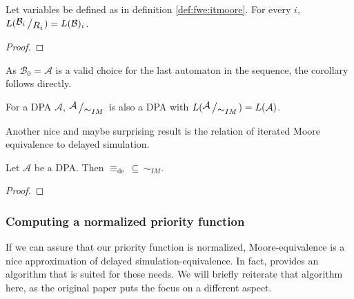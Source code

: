 \begin{lem}
	Let variables be defined as in definition \ref{def:fwe:itmoore}. For every $i$, $L(\bigslant{\mathcal{B}_i}{R_i}) = L(\mathcal{B})_i$.
\end{lem}

\begin{proof}
\end{proof}

As $\mathcal{B}_0 = \mathcal{A}$ is a valid choice for the last automaton in the sequence, the corollary follows directly.

\begin{cor}
	For a DPA $\mathcal{A}$, $\bigslant{\mathcal{A}}{\sim_{IM}}$ is also a DPA with $L(\bigslant{\mathcal{A}}{\sim_{IM}}) = L(\mathcal{A})$.
\end{cor}

\vspace{0.6cm}
Another nice and maybe surprising result is the relation of iterated Moore equivalence to delayed simulation.

\begin{theorem}
	Let $\mathcal{A}$ be a DPA. Then $\equiv_\text{de} \,\subseteq\, \sim_{IM}$.
\end{theorem}

\begin{proof}
\end{proof}



\newpage






\subsubsection{Computing a normalized priority function}
If we can assure that our priority function is normalized, Moore-equivalence is a nice approximation of delayed simulation-equivalence. In fact, \cite{} provides an algorithm that is suited for these needs. We will briefly reiterate that algorithm here, as the original paper puts the focus on a different aspect.

